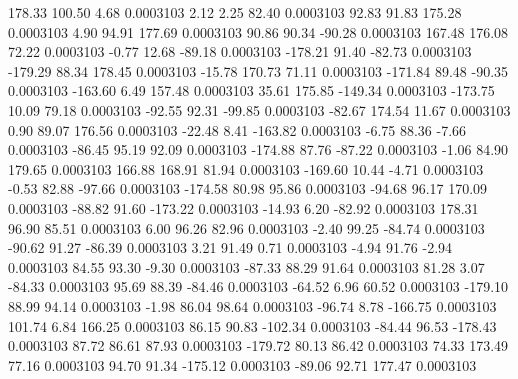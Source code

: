       178.33      100.50        4.68     0.0003103
        2.12        2.25       82.40     0.0003103
       92.83       91.83      175.28     0.0003103
        4.90       94.91      177.69     0.0003103
       90.86       90.34      -90.28     0.0003103
      167.48      176.08       72.22     0.0003103
       -0.77       12.68      -89.18     0.0003103
     -178.21       91.40      -82.73     0.0003103
     -179.29       88.34      178.45     0.0003103
      -15.78      170.73       71.11     0.0003103
     -171.84       89.48      -90.35     0.0003103
     -163.60        6.49      157.48     0.0003103
       35.61      175.85     -149.34     0.0003103
     -173.75       10.09       79.18     0.0003103
      -92.55       92.31      -99.85     0.0003103
      -82.67      174.54       11.67     0.0003103
        0.90       89.07      176.56     0.0003103
      -22.48        8.41     -163.82     0.0003103
       -6.75       88.36       -7.66     0.0003103
      -86.45       95.19       92.09     0.0003103
     -174.88       87.76      -87.22     0.0003103
       -1.06       84.90      179.65     0.0003103
      166.88      168.91       81.94     0.0003103
     -169.60       10.44       -4.71     0.0003103
       -0.53       82.88      -97.66     0.0003103
     -174.58       80.98       95.86     0.0003103
      -94.68       96.17      170.09     0.0003103
      -88.82       91.60     -173.22     0.0003103
      -14.93        6.20      -82.92     0.0003103
      178.31       96.90       85.51     0.0003103
        6.00       96.26       82.96     0.0003103
       -2.40       99.25      -84.74     0.0003103
      -90.62       91.27      -86.39     0.0003103
        3.21       91.49        0.71     0.0003103
       -4.94       91.76       -2.94     0.0003103
       84.55       93.30       -9.30     0.0003103
      -87.33       88.29       91.64     0.0003103
       81.28        3.07      -84.33     0.0003103
       95.69       88.39      -84.46     0.0003103
      -64.52        6.96       60.52     0.0003103
     -179.10       88.99       94.14     0.0003103
       -1.98       86.04       98.64     0.0003103
      -96.74        8.78     -166.75     0.0003103
      101.74        6.84      166.25     0.0003103
       86.15       90.83     -102.34     0.0003103
      -84.44       96.53     -178.43     0.0003103
       87.72       86.61       87.93     0.0003103
     -179.72       80.13       86.42     0.0003103
       74.33      173.49       77.16     0.0003103
       94.70       91.34     -175.12     0.0003103
      -89.06       92.71      177.47     0.0003103
